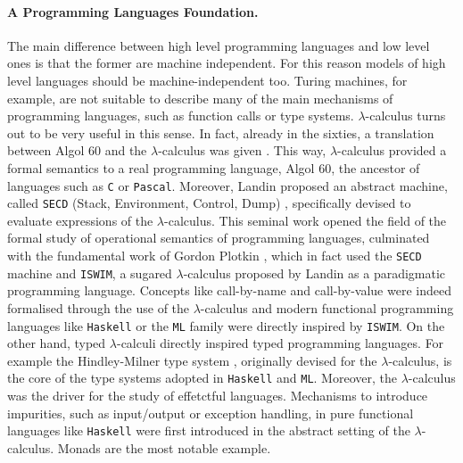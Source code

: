 \paragraph{A Programming Languages Foundation.}
The main difference between high level programming languages and low level ones is that the former are machine independent. For this reason models of high level languages should be machine-independent too. Turing machines, for example, are not suitable to describe many of the main mechanisms of programming languages, such as function calls or type systems. $\lambda$-calculus turns out to be very useful in this sense. In fact, already in the sixties, a translation between Algol 60 and the $\lambda$-calculus was given \cite{landin_correspondence_1965-1, landin_correspondence_1965}. This way, $\lambda$-calculus provided a formal semantics to a real programming language, Algol 60, the ancestor of languages such as \texttt{C} or \texttt{Pascal}. Moreover, Landin proposed an abstract machine, called \texttt{SECD} (Stack, Environment, Control, Dump) \cite{landin_mechanical_1964}, specifically devised to evaluate expressions of the $\lambda$-calculus. This seminal work opened the field of the formal study of operational semantics of programming languages, culminated with the fundamental work of Gordon Plotkin \cite{plotkin_call-by-name_1975}, which in fact used the \texttt{SECD} machine and \texttt{ISWIM}, a sugared $\lambda$-calculus proposed by Landin \cite{landin_next_1966} as a paradigmatic programming language. Concepts like call-by-name and call-by-value were indeed formalised through the use of the $\lambda$-calculus and modern functional programming languages like \texttt{Haskell} or the \texttt{ML} family were directly inspired by \texttt{ISWIM}. On the other hand, typed $\lambda$-calculi directly inspired typed programming languages. For example the Hindley-Milner type system \cite{hindley_principal_1969,milner_theory_1978}, originally devised for the $\lambda$-calculus, is the core of the type systems adopted in \texttt{Haskell} and \texttt{ML}. Moreover, the $\lambda$-calculus was the driver for the study of effetctful languages. Mechanisms to introduce impurities, such as input/output or exception handling, in pure functional languages like \texttt{Haskell} were first introduced in the abstract setting of the $\lambda$-calculus. Monads \cite{moggi_notions_1991} are the most notable example.
